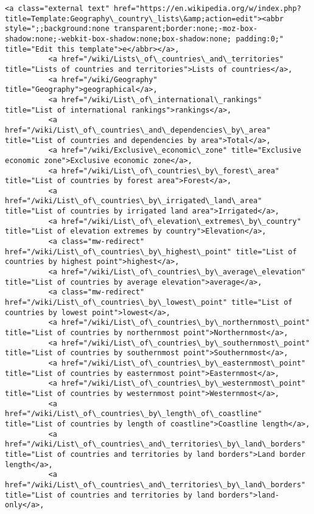 \documentclass[11pt]{article}
\begin{document}
\begin{Verbatim}[commandchars=\\\{\}]
          <a class="external text" href="https://en.wikipedia.org/w/index.php?title=Template:Geography\_country\_lists\&amp;action=edit"><abbr style=";;background:none transparent;border:none;-moz-box-shadow:none;-webkit-box-shadow:none;box-shadow:none; padding:0;" title="Edit this template">e</abbr></a>,
          <a href="/wiki/Lists\_of\_countries\_and\_territories" title="Lists of countries and territories">Lists of countries</a>,
          <a href="/wiki/Geography" title="Geography">geographical</a>,
          <a href="/wiki/List\_of\_international\_rankings" title="List of international rankings">rankings</a>,
          <a href="/wiki/List\_of\_countries\_and\_dependencies\_by\_area" title="List of countries and dependencies by area">Total</a>,
          <a href="/wiki/Exclusive\_economic\_zone" title="Exclusive economic zone">Exclusive economic zone</a>,
          <a href="/wiki/List\_of\_countries\_by\_forest\_area" title="List of countries by forest area">Forest</a>,
          <a href="/wiki/List\_of\_countries\_by\_irrigated\_land\_area" title="List of countries by irrigated land area">Irrigated</a>,
          <a href="/wiki/List\_of\_elevation\_extremes\_by\_country" title="List of elevation extremes by country">Elevation</a>,
          <a class="mw-redirect" href="/wiki/List\_of\_countries\_by\_highest\_point" title="List of countries by highest point">highest</a>,
          <a href="/wiki/List\_of\_countries\_by\_average\_elevation" title="List of countries by average elevation">average</a>,
          <a class="mw-redirect" href="/wiki/List\_of\_countries\_by\_lowest\_point" title="List of countries by lowest point">lowest</a>,
          <a href="/wiki/List\_of\_countries\_by\_northernmost\_point" title="List of countries by northernmost point">Northernmost</a>,
          <a href="/wiki/List\_of\_countries\_by\_southernmost\_point" title="List of countries by southernmost point">Southernmost</a>,
          <a href="/wiki/List\_of\_countries\_by\_easternmost\_point" title="List of countries by easternmost point">Easternmost</a>,
          <a href="/wiki/List\_of\_countries\_by\_westernmost\_point" title="List of countries by westernmost point">Westernmost</a>,
          <a href="/wiki/List\_of\_countries\_by\_length\_of\_coastline" title="List of countries by length of coastline">Coastline length</a>,
          <a href="/wiki/List\_of\_countries\_and\_territories\_by\_land\_borders" title="List of countries and territories by land borders">Land border length</a>,
          <a href="/wiki/List\_of\_countries\_and\_territories\_by\_land\_borders" title="List of countries and territories by land borders">land-only</a>,

\end{Verbatim}
\end{document}
